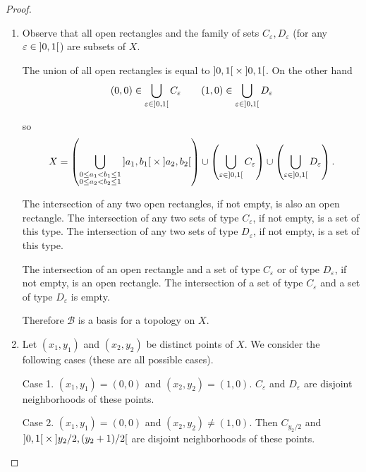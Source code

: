\begin{proof}
    \begin{enumerate}[label={(\alph*)}]
        \item Observe that all open rectangles and the family of sets $C_{\varepsilon}, D_{\varepsilon}$ (for any $\varepsilon \in \left]{0,1}\right[$) are subsets of $X$.

              The union of all open rectangles is equal to $\left]{0,1}\right[\times\left]{0,1}\right[$. On the other hand
              \begin{align*}
                  (0, 0) \in \bigcup_{\varepsilon\in\left]{0,1}\right[}C_{\varepsilon} \qquad
                  (1, 0) \in \bigcup_{\varepsilon\in\left]{0,1}\right[}D_{\varepsilon}
              \end{align*}

              so
              \begin{align*}
                  X = \left(\bigcup_{\substack{0\leq a_{1} < b_{1}\leq 1 \\ 0\leq a_{2} < b_{2}\leq 1}} \left]{a_{1}, b_{1}}\right[ \times \left]{a_{2}, b_{2}}\right[\right) \cup \left(\bigcup_{\varepsilon\in\left]{0,1}\right[}C_{\varepsilon}\right) \cup \left(\bigcup_{\varepsilon\in\left]{0,1}\right[}D_{\varepsilon}\right).
              \end{align*}

              The intersection of any two open rectangles, if not empty, is also an open rectangle. The intersection of any two sets of type $C_{\varepsilon}$, if not empty, is a set of this type. The intersection of any two sets of type $D_{\varepsilon}$, if not empty, is a set of this type.

              The intersection of an open rectangle and a set of type $C_{\varepsilon}$ or of type $D_{\varepsilon}$, if not empty, is an open rectangle. The intersection of a set of type $C_{\varepsilon}$ and a set of type $D_{\varepsilon}$ is empty.

              Therefore $\mathscr{B}$ is a basis for a topology on $X$.
        \item Let $(x_{1}, y_{1})$ and $(x_{2}, y_{2})$ be distinct points of $X$. We consider the following cases (these are all possible cases).

              Case 1. $(x_{1}, y_{1}) = (0, 0)$ and $(x_{2}, y_{2}) = (1, 0)$. $C_{\varepsilon}$ and $D_{\varepsilon}$ are disjoint neighborhoods of these points.

              Case 2. $(x_{1}, y_{1}) = (0, 0)$ and $(x_{2}, y_{2})\ne (1, 0)$. Then $C_{y_{2}/2}$ and $\left]{0, 1}\right[\times\left]{y_{2}/2, (y_{2}+1)/2}\right[$ are disjoint neighborhoods of these points.


\end{enumerate}
\end{proof}
